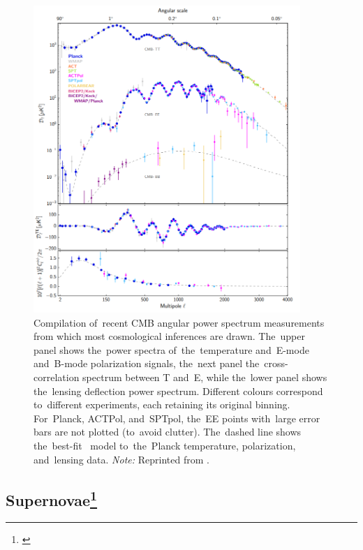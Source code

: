 \begin{figure}[!hbt]
    \centering
    \DIFdelbeginFL %
\DIFdelendFL \DIFaddbeginFL \includegraphics[width=0.9\textwidth]{cosmo_evol/CMB_compilation.png}
    \DIFaddendFL \caption{Compilation of~recent CMB angular power spectrum measurements from which most cosmological inferences are drawn. The~upper panel shows the~power spectra of~the~temperature and~E-mode and~B-mode polarization signals, the~next panel the~cross-correlation spectrum between T and~E, while the~lower panel shows the~lensing deflection power spectrum. Different colours correspond to~different experiments, each retaining its original binning. For~Planck, ACTPol, and~SPTpol, the~EE points with~large error bars are not plotted (to~avoid clutter). The~dashed line shows the~best-fit \LCDM\ model to~the~Planck temperature, polarization, and~lensing data. \textit{Note:} Reprinted from \textcite{2018arXiv180706205P}.}
    \label{fig:cmb_compilation}
\end{figure}
\DIFdelbegin %
\DIFdelend \DIFaddbegin \subsection[Supernovae]{\DIFaddend Supernovae\DIFaddbegin \footnote{\label{ftn1}}\DIFaddend }
